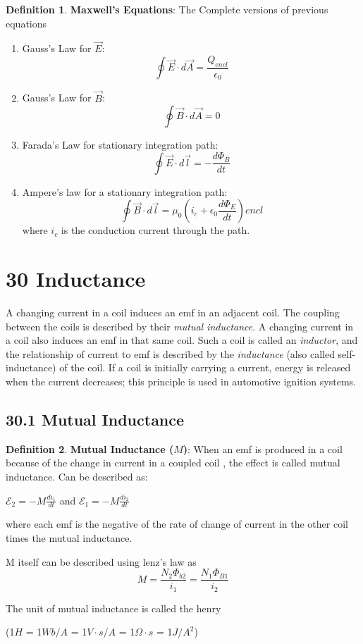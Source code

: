 \documentclass[12pt]{amsart}
\theoremstyle{definition}
\newtheorem{definition}{Definition} %
\numberwithin{equation}{theorem}    %
\begin{document}
\begin{definition}
    \textbf{Maxwell's Equations}:
    The Complete versions of previous equations
    \begin{enumerate}
        \item Gauss's Law for $\vec{E}$: $$\oint \vec{E} \cdot d\vec{A} = \frac{Q_{encl}}{\epsilon_0}$$ 
        \item Gauss's Law for $\vec{B}$: $$\oint \vec{B} \cdot d\vec{A} = 0$$
        \item Farada's Law for stationary integration path:$$\oint \vec{E} \cdot d\vec{l} = -\frac{d\Phi_B}{dt}$$  
        \item Ampere’s law for a stationary integration path:
        $$\oint \vec{B} \cdot d\vec{l} = \mu_0 (i_c + \epsilon_0\frac{d\Phi_E}{dt})encl$$ where $i_c$ is the conduction current through the path.
    \end{enumerate}
\end{definition}

\section*{30 Inductance}
A changing current in a coil induces an emf in an adjacent coil. The coupling between the coils is described by their \textit{mutual inductance}. A changing current in a coil also induces an emf in that same coil. Such a coil is called an \textit{inductor}, and the relationship of current to emf is described by the \textit{inductance} (also called self- inductance) of the coil. If a coil is initially carrying a current, energy is released when the current decreases; this principle is used in automotive ignition systems.

\subsection*{30.1 Mutual Inductance}

\begin{definition}
    \textbf{Mutual Inductance ($M$)}:
    When an emf is produced in a coil because of the change in current in a coupled coil , the effect is called mutual inductance. Can be described as:
    \begin{center}
        $\mathcal{E}_2 = -M\frac{di_1}{dt}$ and $\mathcal{E}_1 = -M\frac{di_2}{dt}$ 
    \end{center}
    where each emf is the negative of the rate of change of current in the other coil times the mutual inductance. 

    M itself can be described using lenz's law as $$M = \frac{N_2 \Phi_{b2}}{i_1} = \frac{N_1\Phi_{B1}}{i_2}$$ 

    The unit of mutual inductance is called the henry 
    \begin{center}
        (1$H$ = 1$Wb/A$ = 1$V\cdot s/A$ = 1$\Omega \cdot s$ = 1$J/A^2$)
    \end{center}
    
\end{definition}
\end{document}
